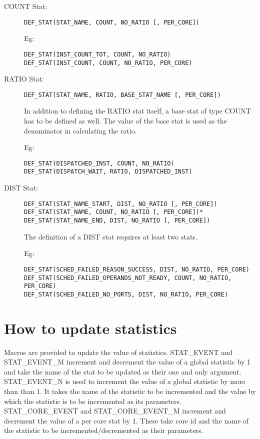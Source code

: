 \begin{description}

\item[COUNT Stat:] 

\Verb+DEF_STAT(STAT_NAME, COUNT, NO_RATIO [, PER_CORE])+

Eg: 
\begin{Verbatim}
DEF_STAT(INST_COUNT_TOT, COUNT, NO_RATIO)
DEF_STAT(INST_COUNT, COUNT, NO_RATIO, PER_CORE)
\end{Verbatim}

\item[RATIO Stat:] \Verb+DEF_STAT(STAT_NAME, RATIO, BASE_STAT_NAME [, PER_CORE])+


In addition to defining the RATIO stat itself, a base stat of type COUNT has to
be defined as well. The value of the base stat is used as the denominator in
calculating the ratio. 

Eg: 
\begin{Verbatim}
DEF_STAT(DISPATCHED_INST, COUNT, NO_RATIO)
DEF_STAT(DISPATCH_WAIT, RATIO, DISPATCHED_INST)
\end{Verbatim}

\item[DIST Stat:] 
\begin{Verbatim}
DEF_STAT(STAT_NAME_START, DIST, NO_RATIO [, PER_CORE])
DEF_STAT(STAT_NAME, COUNT, NO_RATIO [, PER_CORE])*
DEF_STAT(STAT_NAME_END, DIST, NO_RATIO [, PER_CORE])
\end{Verbatim}

The definition of a DIST stat requires at least two stats.

Eg: 
\begin{Verbatim}
DEF_STAT(SCHED_FAILED_REASON_SUCCESS, DIST, NO_RATIO, PER_CORE)
DEF_STAT(SCHED_FAILED_OPERANDS_NOT_READY, COUNT, NO_RATIO, PER_CORE)
DEF_STAT(SCHED_FAILED_NO_PORTS, DIST, NO_RATIO, PER_CORE)
\end{Verbatim}

\end{description}






\section{How to update statistics}



Macros are provided to update the value of statistics. STAT\_EVENT and
STAT\_EVENT\_M increment and decrement the value of a global statistic by 1 and
take the name of the stat to be updated as their one and only argument.
STAT\_EVENT\_N is used to increment the value of a global statistic by more
than than 1. It takes the name of the statistic to be incremented and the value
by which the statistic is to be incremented as its parameters.
STAT\_CORE\_EVENT and STAT\_CORE\_EVENT\_M increment and decrement the value of
a per core stat by 1. These take core id and the name of the statistic to be
incremented/decremented as their parameters.


